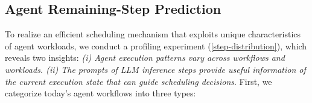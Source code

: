 \subsection{Agent Remaining-Step Prediction}
\label{sec:4.2}

To realize an efficient scheduling mechanism that exploits unique characteristics of agent workloads, we conduct a profiling experiment
(\autoref{step-distribution}), which reveals two insights: {\em (i) Agent execution patterns vary across workflows and workloads. (ii) The prompts of LLM inference steps provide useful information of the current execution state that can guide scheduling decisions}. 
First, we categorize today's agent workflows into three types:

